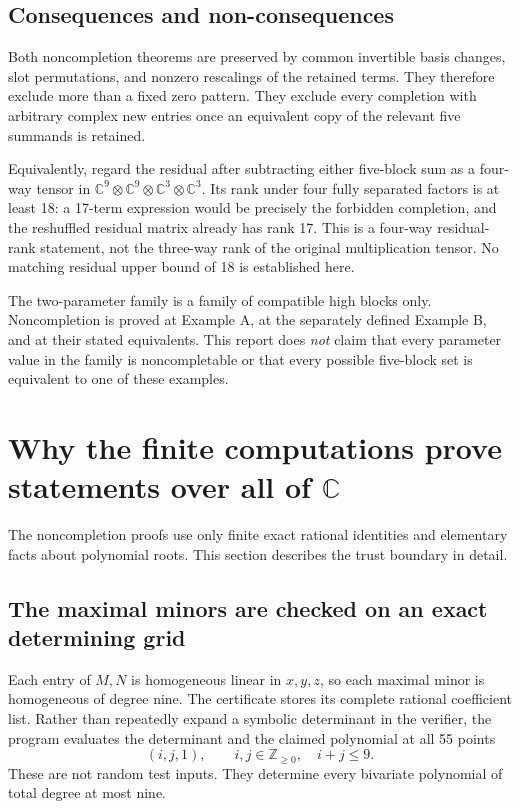 \documentclass[11pt]{article}
\theoremstyle{definition}\newtheorem{definition}[theorem]{Definition}
\newcommand{\C}{\mathbb C}\newcommand{\Q}{\mathbb Q}
\begin{document}
\subsection{Consequences and non-consequences}
Both noncompletion theorems are preserved by common invertible basis changes, slot permutations, and nonzero rescalings of the retained terms. They therefore exclude more than a fixed zero pattern. They exclude every completion with arbitrary complex new entries once an equivalent copy of the relevant five summands is retained.

Equivalently, regard the residual after subtracting either five-block sum as a four-way tensor in $\C^9\otimes\C^9\otimes\C^3\otimes\C^3$. Its rank under four fully separated factors is at least 18: a 17-term expression would be precisely the forbidden completion, and the reshuffled residual matrix already has rank 17. This is a four-way residual-rank statement, not the three-way rank of the original multiplication tensor. No matching residual upper bound of 18 is established here.

The two-parameter family is a family of compatible high blocks only. Noncompletion is proved at Example A, at the separately defined Example B, and at their stated equivalents. This report does \emph{not} claim that every parameter value in the family is noncompletable or that every possible five-block set is equivalent to one of these examples.

\section{Why the finite computations prove statements over all of $\C$}\label{sec:certificates}
The noncompletion proofs use only finite exact rational identities and elementary facts about polynomial roots. This section describes the trust boundary in detail.

\subsection{The maximal minors are checked on an exact determining grid}
Each entry of $M,N$ is homogeneous linear in $x,y,z$, so each maximal minor is homogeneous of degree nine. The certificate stores its complete rational coefficient list. Rather than repeatedly expand a symbolic determinant in the verifier, the program evaluates the determinant and the claimed polynomial at all 55 points
\[
(i,j,1),\qquad i,j\in\mathbb Z_{\ge0},\quad i+j\le9.
\]
These are not random test inputs. They determine every bivariate polynomial of total degree at most nine.
\end{document}
